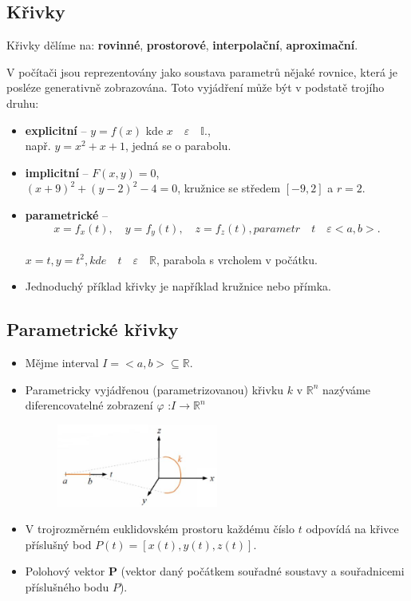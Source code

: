 \subsection{Křivky}
Křivky dělíme na: \textbf{rovinné}, \textbf{prostorové}, \textbf{interpolační}, \textbf{aproximační}.

V počítači jsou reprezentovány jako soustava parametrů nějaké rovnice, která je posléze generativně zobrazována. Toto vyjádření může být v podstatě trojího druhu:
\begin{itemize}
	\item \textbf{explicitní} -- $y = f(x)$  kde  $x \quad \varepsilon \quad  \mathbb{I}$.,\\ např. $y = x^{2} + x + 1$, jedná se o parabolu.
	\item \textbf{implicitní} -- $F(x, y) = 0$, \\		$(x+9)^{2} +(y −2)^{2} −4 = 0$, kružnice se středem $[−9, 2]$ a $r=2$.
	\item \textbf{parametrické} -- 		
	\begin{equation*}
				x = f_x(t), \quad y= f_y(t), \quad z = f_z(t), parametr \quad t \quad \varepsilon <a, b>.
		\end{equation*}
		\\		$x = t, y = t^{2}, kde \quad t \quad \varepsilon \quad \mathbb{R}$, parabola s vrcholem v počátku.
		\item Jednoduchý příklad křivky je například kružnice nebo přímka.
\end{itemize}

\subsection{Parametrické křivky}
\begin{itemize}
	\item Mějme interval $I = <a, b> \subseteq \mathbb{R}$.
	\item Parametricky vyjádřenou (parametrizovanou) křivku $k$ v $\mathbb{R}^n$ nazýváme diferencovatelné zobrazení $\varphi$  :$I \rightarrow \mathbb{R}^n$
\begin{figure}[H]
\centering
\includegraphics[width=0.5\textwidth]{assets/3_param_curve}
\end{figure}
	\item V trojrozměrném euklidovském prostoru každému číslo $t$ odpovídá na křivce příslušný bod $P(t) = [x(t), y(t), z(t)]$.
	\item Polohový vektor \textbf{P} (vektor daný počátkem souřadné soustavy a souřadnicemi příslušného bodu $P$).
\end{itemize}

